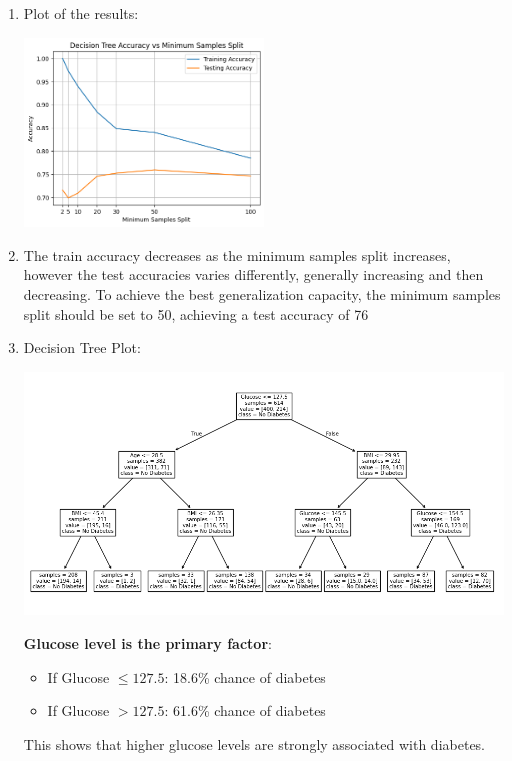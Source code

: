 \documentclass{article}
\begin{document}
\begin{enumerate}[leftmargin=\labelsep]
\item Plot of the results:
    \begin{center}
        \includegraphics[width=0.5\textwidth]{img/tree_acc_vs_split.png} 
    \end{center}

\item The train accuracy decreases as the minimum samples split increases, however the test accuracies varies differently, generally increasing and then decreasing. To achieve the best generalization capacity, the minimum samples split should be set to 50, achieving a test accuracy of 76%

\item Decision Tree Plot:
    \begin{center}
        \includegraphics[width=1\textwidth]{img/tree_plot.png} 
    \end{center}

    \textbf{Glucose level is the primary factor}:
    \begin{itemize}
        \item If Glucose $\leq 127.5$: 18.6\% chance of diabetes
        \item If Glucose $> 127.5$: 61.6\% chance of diabetes
    \end{itemize}
    This shows that higher glucose levels are strongly associated with diabetes.


\end{enumerate}
\end{document}
